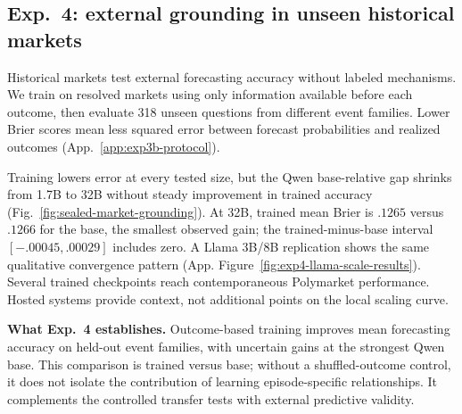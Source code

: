 \subsection{Exp.~4: external grounding in unseen historical markets}
\label{sec:exp4}

Historical markets test external forecasting accuracy without labeled mechanisms. We train on resolved markets using only
information available before each outcome, then evaluate 318 unseen questions
from different event families. Lower Brier scores mean less squared error
between forecast probabilities and realized outcomes
(App.~\ref{app:exp3b-protocol}).

Training lowers
error at every tested size, but the Qwen base-relative gap shrinks from 1.7B to
32B without steady improvement in trained accuracy (Fig.~\ref{fig:sealed-market-grounding}). At 32B, trained mean Brier is \(.1265\)
versus \(.1266\) for the base, the smallest observed gain; the trained-minus-base
interval \([-.00045,.00029]\) includes zero. A Llama 3B/8B
replication shows the same qualitative convergence pattern
(App. Figure~\ref{fig:exp4-llama-scale-results}). Several trained checkpoints
reach contemporaneous Polymarket performance. Hosted systems provide context,
not additional points on the local scaling curve.

\noindent\textbf{What Exp.~4 establishes.}
Outcome-based training improves mean forecasting accuracy on held-out event
families, with uncertain gains at the strongest Qwen base. This comparison is
trained versus base; without a shuffled-outcome control, it does not isolate the
contribution of learning episode-specific relationships. It complements the controlled transfer tests with external predictive validity.
